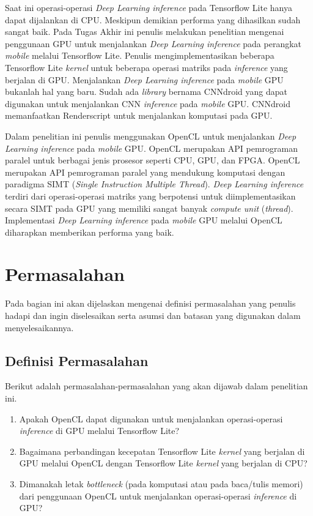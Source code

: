 Saat ini operasi-operasi \textit{Deep Learning inference} pada Tensorflow Lite hanya dapat dijalankan di CPU. Meskipun demikian performa yang dihasilkan sudah sangat baik. Pada Tugas Akhir ini penulis melakukan penelitian mengenai penggunaan GPU untuk menjalankan \textit{Deep Learning inference} pada perangkat \textit{mobile} melalui Tensorflow Lite. Penulis mengimplementasikan beberapa Tensorflow Lite \textit{kernel} untuk beberapa operasi matriks pada \textit{inference} yang berjalan di GPU. Menjalankan \textit{Deep Learning inference} pada \textit{mobile} GPU bukanlah hal yang baru. Sudah ada \textit{library} bernama CNNdroid \cite{cnndroid} yang dapat digunakan untuk menjalankan CNN \textit{inference} pada \textit{mobile} GPU. CNNdroid memanfaatkan Renderscript untuk menjalankan komputasi pada GPU.

Dalam penelitian ini penulis menggunakan OpenCL untuk menjalankan \textit{Deep Learning inference} pada \textit{mobile} GPU. OpenCL \cite{opencl} merupakan API pemrograman paralel untuk berbagai jenis prosesor seperti CPU, GPU, dan FPGA. OpenCL merupakan API pemrograman paralel yang mendukung komputasi dengan paradigma SIMT (\textit{Single Instruction Multiple Thread}). \textit{Deep Learning inference} terdiri dari operasi-operasi matriks yang berpotensi untuk diimplementasikan secara SIMT pada GPU yang memiliki sangat banyak \textit{compute unit} (\textit{thread}). Implementasi \textit{Deep Learning inference} pada \textit{mobile} GPU melalui OpenCL diharapkan memberikan performa yang baik.

\section{Permasalahan}
Pada bagian ini akan dijelaskan mengenai definisi permasalahan 
yang penulis hadapi dan ingin diselesaikan serta asumsi dan batasan yang digunakan dalam menyelesaikannya.
\subsection{Definisi Permasalahan}
Berikut adalah permasalahan-permasalahan yang akan dijawab dalam penelitian ini.
\begin{enumerate}
\item Apakah OpenCL dapat digunakan untuk menjalankan operasi-operasi \textit{inference} di GPU melalui Tensorflow Lite?
\item Bagaimana perbandingan kecepatan Tensorflow Lite \textit{kernel} yang berjalan di GPU melalui OpenCL dengan Tensorflow Lite \textit{kernel} yang berjalan di CPU?
\item Dimanakah letak \textit{bottleneck} (pada komputasi atau pada baca/tulis memori) dari penggunaan OpenCL untuk menjalankan operasi-operasi \textit{inference} di GPU?

\end{enumerate}

